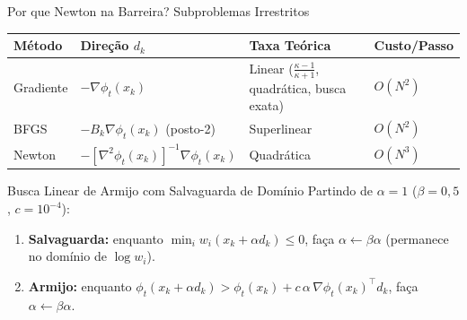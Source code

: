 \documentclass[aspectratio=43]{beamer}
\begin{document}
\begin{frame}{Por que Newton na Barreira? Subproblemas Irrestritos}
  \begin{table}
    \centering
    \scriptsize
    \begin{tabular}{@{}llll@{}}
      \toprule
      \textbf{Método} & \textbf{Direção $d_k$} & \textbf{Taxa Teórica} & \textbf{Custo/Passo} \\
      \midrule
      Gradiente & $-\nabla\phi_t(x_k)$ & Linear ($\frac{\kappa-1}{\kappa+1}$, quadrática, busca exata) & $O(N^2)$ \\
      BFGS & $-B_k\nabla\phi_t(x_k)$ (posto-2) & Superlinear & $O(N^2)$ \\
      Newton & $-[\nabla^2\phi_t(x_k)]^{-1}\nabla\phi_t(x_k)$ & Quadrática & $O(N^3)$ \\
      \bottomrule
    \end{tabular}
  \end{table}

  \vspace{0.15cm}
  \begin{block}{Busca Linear de Armijo com Salvaguarda de Domínio}
    Partindo de $\alpha = 1$ ($\beta = 0{,}5$, $c = 10^{-4}$):
    \begin{enumerate}
      \item \textbf{Salvaguarda:} enquanto $\min_i w_i(x_k + \alpha d_k) \le 0$, faça $\alpha \leftarrow \beta\alpha$ (permanece no domínio de $\log w_i$).
      \item \textbf{Armijo:} enquanto $\phi_t(x_k + \alpha d_k) > \phi_t(x_k) + c\,\alpha\,\nabla\phi_t(x_k)^\top d_k$, faça $\alpha \leftarrow \beta\alpha$.
    \end{enumerate}
  \end{block}
\end{frame}
\end{document}
